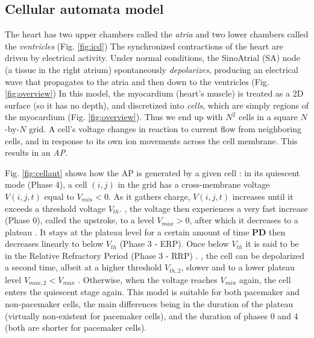 \subsection{Cellular automata model}
The heart has two upper chambers called the \emph{atria} and two lower chambers called the \emph{ventricles} (Fig. \ref{fig:icd})
The synchronized contractions of the heart are driven by electrical activity.
Under normal conditions, the SinoAtrial (SA) node (a tissue in the right atrium) spontaneously \emph{depolarizes}, producing an electrical wave that propagates to the atria and then down to the ventricles (Fig.\ref{fig:overview})
In this model, the myocardium (heart's muscle) is treated as a 2D surface (so it has no depth), and discretized into \emph{cells}, which are simply regions of the myocardium (Fig. \ref{fig:overview}). 
Thus we end up with $N^2$ cells in a square $N$-by-$N$ grid.
A cell's voltage changes in reaction to current flow from neighboring cells, and in response to its own ion movements across the cell membrane.
This results in an \emph{\ac{AP}}.

Fig. \ref{fig:cellaut} shows how the \ac{AP} is generated by a given cell \cite{Klabunde_CVEPconcepts}:
in its quiescent mode (Phase 4), a cell $(i,j)$ in the grid has a cross-membrane voltage $V(i,j,t)$ equal to $V_{min} < 0$.
As it gathers charge, $V(i,j,t)$  increases until it exceeds a threshold voltage $V_{th}$.
, the voltage then experiences a very fast increase (Phase 0), called the upstroke, to a level $V_{max} > 0$, after which it decreases  to a plateau .
It stays at the plateau level for a certain amount of time \textbf{PD} then decreases linearly to below $V_{th}$ (Phase 3 - ERP).
Once below $V_{th}$ it is said to be in the Relative Refractory Period (Phase 3 - RRP) .
, the cell can be depolarized a second time, albeit at a higher threshold $V_{th,2}$, slower and to a lower plateau level $V_{max,2} < V_{max}$ .
Otherwise, when the voltage reaches $V_{min}$ again, the cell enters the quiescent stage again. 
This model is suitable for both pacemaker and non-pacemaker cells, the main differences being in the duration of the plateau (virtually non-existent for pacemaker cells), and the duration of phases 0 and 4 (both are shorter for pacemaker cells).

